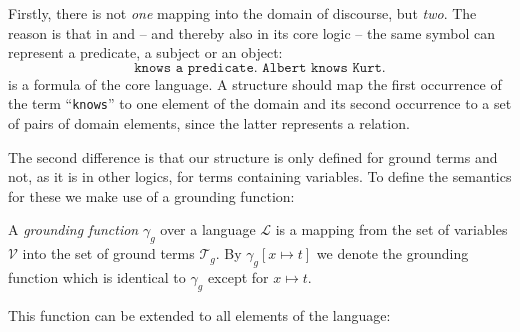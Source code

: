 Firstly, there is not \emph{one} mapping into the domain of discourse, but \emph{two}. The reason is that in \rdf and \nthree{} -- and thereby also in its core logic -- the 
same symbol 
can represent a predicate, a subject or an object:
\[
 \texttt{knows a predicate. Albert knows Kurt.}
\]
is a formula of the core language. A structure should map the first occurrence of the term ``\texttt{knows}'' to one element of the domain and its second occurrence to 
a set of pairs of domain elements, since the latter 
represents a relation. 

The second difference is that our structure is only defined for ground terms and not, as it is in other logics, for terms containing variables. 
To define the semantics for these we make use of a grounding function:


\begin{definition}
A \emph{grounding function} $\gamma_g$ over a language $\mathcal{L}$ is a mapping from the set of variables $\mathcal{V}$ %
into the set of ground terms $\mathcal{T}_g$. %
By $\gamma_g [x\mapsto t]$ 
 we denote the grounding function which is identical to $\gamma_g$ except for $x\mapsto t$. 
\end{definition}

This function can be extended to all elements of the language:

